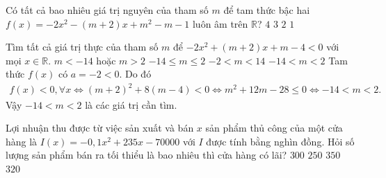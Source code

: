 \begin{ex}%
	Có tất cả bao nhiêu giá trị nguyên của tham số $m$ để tam thức bậc hai $f(x)=-2x^2-\left(m+2\right)x+m^2-m-1$ luôn âm trên $\mathbb{R}$?
	\choice
	{$4$}
	{$3$}
	{$2$}
	{\True $1$}
\end{ex}

\begin{ex}%
	Tìm tất cả giá trị thực của tham số $m$ để $-2x^2+(m+2)x+m-4 <0$ với mọi $x \in \mathbb{R}$. 
	\choice
	{$m<-14$ hoặc $m>2$}
	{$-14\le m\le 2$}
	{$-2<m<14$}
	{\True $-14<m<2$}
	\loigiai
	{
		Tam thức $f(x)$ có $a=-2<0$. Do đó
		\allowdisplaybreaks
		\begin{eqnarray*}
			f(x)<0,\forall x \Leftrightarrow (m+2)^2+8(m-4)<0 \Leftrightarrow m^2+12m-28\leq 0 \Leftrightarrow -14<m<2.
		\end{eqnarray*}
		Vậy $-14<m<2$ là các giá trị cần tìm.
	}
\end{ex}

\begin{ex}
	Lợi nhuận thu được từ việc sản xuất và bán $x$ sản phẩm thủ công của một cửa hàng là 
	$I(x)=-0{,}1x^2+235x-70000$ với $I$ được tính bằng nghìn đồng. Hỏi số lượng sản phẩm bán ra tối thiểu là bao nhiêu thì cửa hàng có lãi?
	\choice
	{$300$}
	{$250$}
	{\True $350$}
	{$320$}
\end{ex}


